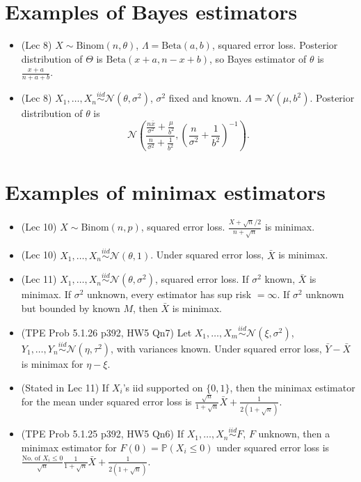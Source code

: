 \documentclass[twoside]{article}
\newcommand{\dis}{\displaystyle}
\newcommand\bbP{\mathbb{P}}
\newcommand\calN{\mathcal{N}}
\newcommand\Lmb{\Lambda}
\newcommand\sg{\sigma}
\def\t{\theta}
\newcommand\T{\Theta}
\begin{document}
\section*{Examples of Bayes estimators}
\begin{itemize}
\item (Lec 8) $X \sim \text{Binom}(n, \t)$, $\Lmb = \text{Beta}(a,b)$, squared error loss. Posterior distribution of $\T$ is $\text{Beta}(x+a, n-x+b)$, so Bayes estimator of $\t$ is $\displaystyle\frac{x+a}{n + a + b}$.

\item (Lec 8) $X_1, \dots, X_n \stackrel{iid}{\sim} \calN (\t, \sg^2)$, $\sg^2$ fixed and known. $\Lmb = \calN(\mu, b^2)$. Posterior distribution of $\t$ is
\begin{equation*}
\calN \left( \frac{\frac{n\bar{x}}{\sg^2} + \frac{\mu}{b^2}}{\frac{n}{\sg^2} + \frac{1}{b^2}}, \left( \frac{n}{\sg^2} + \frac{1}{b^2} \right)^{-1} \right).
\end{equation*}
\end{itemize}

\section*{Examples of minimax estimators}
\begin{itemize}
\item (Lec 10) $X \sim \text{Binom}(n, p)$, squared error loss. $\displaystyle\frac{X + \sqrt{n}/2}{n + \sqrt{n}}$ is minimax.

\item (Lec 10) $X_1, \dots, X_n \stackrel{iid}{\sim} \calN (\t,1)$. Under squared error loss, $\bar{X}$ is minimax.

\item (Lec 11) $X_1, \dots, X_n \stackrel{iid}{\sim} \calN (\t,\sg^2)$, squared error loss. If $\sg^2$ known, $\bar{X}$ is minimax. If $\sg^2$ unknown, every estimator has sup risk $= \infty$. If $\sg^2$ unknown but bounded by known $M$, then $\bar{X}$ is minimax.

\item (TPE Prob 5.1.26 p392, HW5 Qn7) Let $X_1, \dots, X_m \stackrel{iid}{\sim} \calN(\xi, \sg^2)$, $Y_1, \dots, Y_n \stackrel{iid}{\sim} \calN(\eta, \tau^2)$, with variances known. Under squared error loss, $\bar{Y} - \bar{X}$ is minimax for $\eta - \xi$.

\item (Stated in Lec 11) If $X_i$'s iid supported on $\{ 0,1\}$, then the minimax estimator for the mean under squared error loss is $\displaystyle\frac{\sqrt{n}}{1+\sqrt{n}}\bar{X} + \displaystyle\frac{1}{2(1+\sqrt{n})}$.

\item (TPE Prob 5.1.25 p392, HW5 Qn6) If $X_1, \dots, X_n \stackrel{iid}{\sim} F$, $F$ unknown, then a minimax estimator for $F(0) = \bbP(X_i \leq 0)$ under squared error loss is $\dis\frac{\text{No. of } X_i \leq 0}{\sqrt{n}}\frac{1}{1+\sqrt{n}}\bar{X} + \displaystyle\frac{1}{2(1+\sqrt{n})}$.
\end{itemize}
\end{document}
